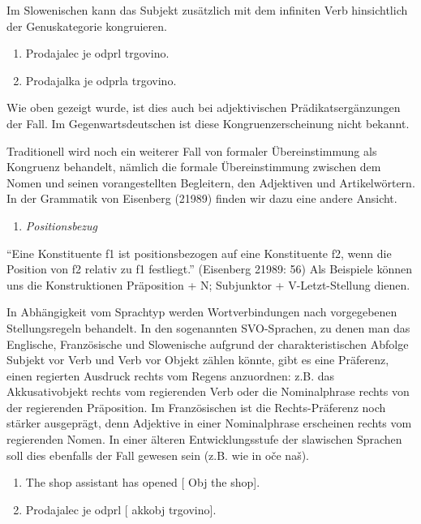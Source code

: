 \documentclass[
]{article}
\providecommand{\tightlist}{%
  \setlength{\itemsep}{0pt}\setlength{\parskip}{0pt}}
\begin{document}
Im Slowenischen kann das Subjekt zusätzlich mit dem infiniten Verb hinsichtlich der Genuskategorie kongruieren.

\begin{enumerate}
\def\labelenumi{(\arabic{enumi})}
\setcounter{enumi}{17}
\tightlist
\item
  Prodajalec je odprl trgovino.
\item
  Prodajalka je odprla trgovino.
\end{enumerate}

Wie oben gezeigt wurde, ist dies auch bei adjektivischen Prädikatsergänzungen der Fall. Im Gegenwartsdeutschen ist diese Kongruenzerscheinung nicht bekannt.

Traditionell wird noch ein weiterer Fall von formaler Übereinstimmung als Kongruenz behandelt, nämlich die formale Übereinstimmung zwischen dem Nomen und seinen vorangestellten Begleitern, den Adjektiven und Artikelwörtern. In der Grammatik von Eisenberg (21989) finden wir dazu eine andere Ansicht.

\begin{enumerate}
\def\labelenumi{\arabic{enumi}.}
\setcounter{enumi}{3}
\tightlist
\item
  \emph{Positionsbezug}
\end{enumerate}

``Eine Konstituente f1 ist positionsbezogen auf eine Konstituente f2, wenn die Position von f2 relativ zu f1 festliegt.'' (Eisenberg 21989: 56) Als Beispiele können uns die Konstruktionen Präposition + N; Subjunktor + V-Letzt-Stellung dienen.

In Abhängigkeit vom Sprachtyp werden Wortverbindungen nach vorgegebenen Stellungsregeln behandelt. In den sogenannten SVO-Sprachen, zu denen man das Englische, Französische und Slowenische aufgrund der charakteristischen Abfolge Subjekt vor Verb und Verb vor Objekt zählen könnte, gibt es eine Präferenz, einen regierten Ausdruck rechts vom Regens anzuordnen: z.B. das Akkusativobjekt rechts vom regierenden Verb oder die Nominalphrase rechts von der regierenden Präposition. Im Französischen ist die Rechts-Präferenz noch stärker ausgeprägt, denn Adjektive in einer Nominalphrase erscheinen rechts vom regierenden Nomen. In einer älteren Entwicklungsstufe der slawischen Sprachen soll dies ebenfalls der Fall gewesen sein (z.B. wie in oče naš).

\begin{enumerate}
\def\labelenumi{(\arabic{enumi})}
\setcounter{enumi}{19}
\tightlist
\item
  The shop assistant has opened {[} Obj the shop{]}.
\item
  Prodajalec je odprl {[} akkobj trgovino{]}.
\end{enumerate}
\end{document}
